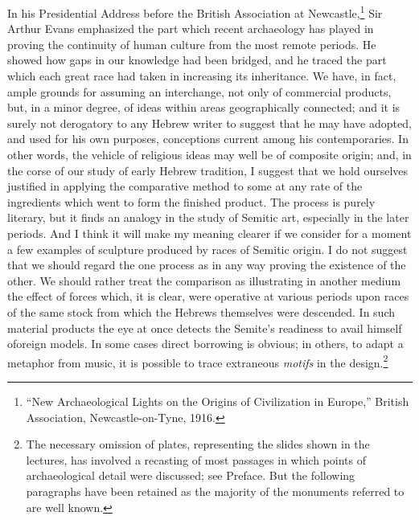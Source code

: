 \documentclass[12pt,oneside]{book}
\begin{document}
In his Presidential Address before the British Association at Newcastle,\footnote{``New Archaeological Lights on the Origins of Civilization in Europe,'' British Association, Newcastle-on-Tyne, 1916.} Sir Arthur Evans emphasized the part which recent archaeology has played in proving the continuity of human culture from the most remote periods. He showed how gaps in our knowledge had been bridged, and he traced the part which each great race had taken in increasing its inheritance. We have, in fact, ample grounds for assuming an interchange, not only of commercial products, but, in a minor degree, of ideas within areas geographically connected; and it is surely not derogatory to any Hebrew writer to suggest that he may have adopted, and used for his own purposes, conceptions current among his contemporaries. In other words, the vehicle of religious ideas may well be of composite origin; and, in the corse of our study of early Hebrew tradition, I suggest that we hold ourselves justified in applying the comparative method to some at any rate of the ingredients which went to form the finished product. The process is purely literary, but it finds an analogy in the study of Semitic art, especially in the later periods. And I think it will make my meaning clearer if we consider for a moment a few examples of sculpture produced by races of Semitic origin. I do not suggest that we should regard the one process as in any way proving the existence of the other. We should rather treat the comparison as illustrating in another medium the effect of forces which, it is clear, were operative at various periods upon races of the same stock from which the Hebrews themselves were descended. In such material products the eye at once detects the Semite's readiness to avail himself oforeign models. In some cases direct borrowing is obvious; in others, to adapt a metaphor from music, it is possible to trace extraneous \textit{motifs} in the design.\footnote{The necessary omission of plates, representing the slides shown in the lectures, has involved a recasting of most passages in which points of archaeological detail were discussed; see Preface. But the following paragraphs have been retained as the majority of the monuments referred to are well known.} \par 
\end{document}
